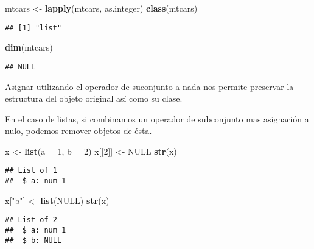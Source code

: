 \documentclass[]{article}
\newenvironment{Shaded}{\begin{snugshade}}{\end{snugshade}}
\newcommand{\KeywordTok}[1]{\textcolor[rgb]{0.13,0.29,0.53}{\textbf{#1}}}
\newcommand{\DataTypeTok}[1]{\textcolor[rgb]{0.13,0.29,0.53}{#1}}
\newcommand{\DecValTok}[1]{\textcolor[rgb]{0.00,0.00,0.81}{#1}}
\newcommand{\StringTok}[1]{\textcolor[rgb]{0.31,0.60,0.02}{#1}}
\newcommand{\OtherTok}[1]{\textcolor[rgb]{0.56,0.35,0.01}{#1}}
\newcommand{\NormalTok}[1]{#1}
\begin{document}
\begin{Shaded}
\begin{Highlighting}[]
\NormalTok{mtcars <-}\StringTok{ }\KeywordTok{lapply}\NormalTok{(mtcars, as.integer)}
\KeywordTok{class}\NormalTok{(mtcars)}
\end{Highlighting}
\end{Shaded}

\begin{verbatim}
## [1] "list"
\end{verbatim}

\begin{Shaded}
\begin{Highlighting}[]
\KeywordTok{dim}\NormalTok{(mtcars)}
\end{Highlighting}
\end{Shaded}

\begin{verbatim}
## NULL
\end{verbatim}

Asignar utilizando el operador de suconjunto a nada nos permite
preservar la estructura del objeto original así como su clase.

En el caso de listas, si combinamos un operador de subconjunto mas
asignación a nulo, podemos remover objetos de ésta.

\begin{Shaded}
\begin{Highlighting}[]
\NormalTok{x <-}\StringTok{ }\KeywordTok{list}\NormalTok{(}\DataTypeTok{a =} \DecValTok{1}\NormalTok{, }\DataTypeTok{b =} \DecValTok{2}\NormalTok{)}
\NormalTok{x[[}\DecValTok{2}\NormalTok{]] <-}\StringTok{ }\OtherTok{NULL}
\KeywordTok{str}\NormalTok{(x)}
\end{Highlighting}
\end{Shaded}

\begin{verbatim}
## List of 1
##  $ a: num 1
\end{verbatim}

\begin{Shaded}
\begin{Highlighting}[]
\NormalTok{x[}\StringTok{"b"}\NormalTok{] <-}\StringTok{ }\KeywordTok{list}\NormalTok{(}\OtherTok{NULL}\NormalTok{)}
\KeywordTok{str}\NormalTok{(x)}
\end{Highlighting}
\end{Shaded}

\begin{verbatim}
## List of 2
##  $ a: num 1
##  $ b: NULL
\end{verbatim}
\end{document}
